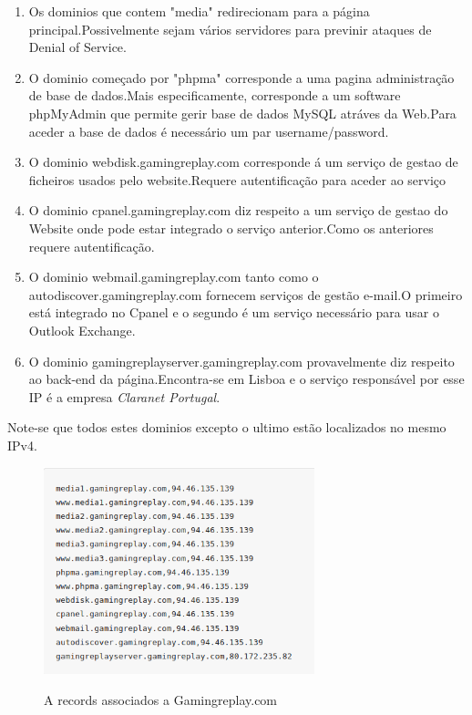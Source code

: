 \begin{enumerate}

\item Os dominios que contem "media" redirecionam para a página principal.Possivelmente sejam vários servidores para previnir ataques de Denial of Service.
\newline
\item O dominio começado por "phpma" corresponde a uma pagina administração de base de dados.Mais especificamente, corresponde a um software phpMyAdmin que permite gerir base de dados MySQL atráves da Web.Para aceder a base de dados é necessário um par username/password.
\newline
\item O dominio webdisk.gamingreplay.com corresponde á um serviço de gestao de ficheiros usados pelo website.Requere autentificação para aceder ao serviço
\newline
\item O dominio cpanel.gamingreplay.com diz respeito a um serviço de gestao do Website onde pode estar integrado o serviço anterior.Como os anteriores requere autentificação.
\newline
\item O dominio webmail.gamingreplay.com tanto como o autodiscover.gamingreplay.com fornecem serviços de gestão e-mail.O primeiro está integrado no Cpanel e o segundo é um serviço necessário para usar o Outlook Exchange.
\newline
\item O dominio gamingreplayserver.gamingreplay.com provavelmente diz respeito ao back-end da página.Encontra-se em Lisboa e o serviço responsável por esse IP é a empresa \emph{Claranet Portugal}.
\hfill\\
\end{enumerate}

Note-se que todos estes dominios excepto o ultimo estão localizados no mesmo IPv4.

\begin{figure}[h!]
\caption{A records associados a Gamingreplay.com}
\centering
\includegraphics[width=\textwidth,height=6cm,keepaspectratio]{Images/DNSArecords.png}
\label{fig:DNSArecords}
\end{figure}

